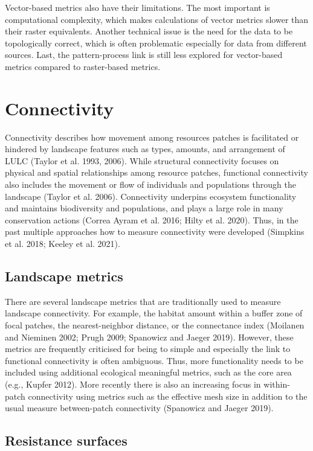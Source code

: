 \documentclass[
  10pt,
  a4paperpaper,
]{article}
\begin{document}
Vector-based metrics also have their limitations. The most important is
computational complexity, which makes calculations of vector metrics
slower than their raster equivalents. Another technical issue is the
need for the data to be topologically correct, which is often
problematic especially for data from different sources. Last, the
pattern-process link is still less explored for vector-based metrics
compared to raster-based metrics.

\section{Connectivity}\label{connectivity}

Connectivity describes how movement among resources patches is
facilitated or hindered by landscape features such as types, amounts,
and arrangement of LULC (Taylor et al. 1993, 2006). While structural
connectivity focuses on physical and spatial relationships among
resource patches, functional connectivity also includes the movement or
flow of individuals and populations through the landscape (Taylor et al.
2006). Connectivity underpins ecosystem functionality and maintains
biodiversity and populations, and plays a large role in many
conservation actions (Correa Ayram et al. 2016; Hilty et al. 2020).
Thus, in the past multiple approaches how to measure connectivity were
developed (Simpkins et al. 2018; Keeley et al. 2021).

\subsection{Landscape metrics}\label{landscape-metrics-1}

There are several landscape metrics that are traditionally used to
measure landscape connectivity. For example, the habitat amount within a
buffer zone of focal patches, the nearest-neighbor distance, or the
connectance index (Moilanen and Nieminen 2002; Prugh 2009; Spanowicz and
Jaeger 2019). However, these metrics are frequently criticised for being
to simple and especially the link to functional connectivity is often
ambiguous. Thus, more functionality needs to be included using
additional ecological meaningful metrics, such as the core area (e.g.,
Kupfer 2012). More recently there is also an increasing focus in
within-patch connectivity using metrics such as the effective mesh size
in addition to the usual measure between-patch connectivity (Spanowicz
and Jaeger 2019).

\subsection{Resistance surfaces}\label{resistance-surfaces}
\end{document}

